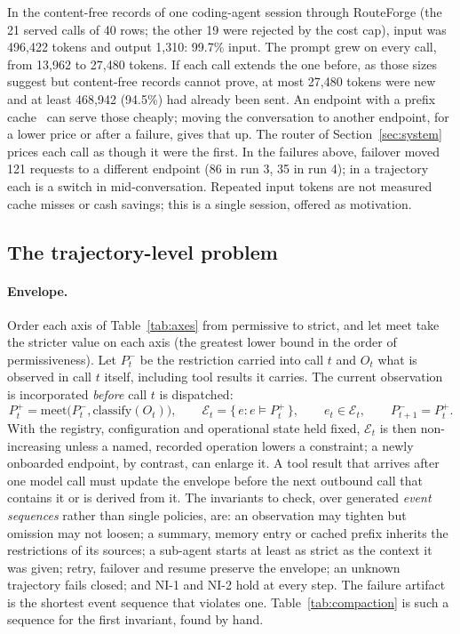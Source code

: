 \documentclass[11pt]{article}
\newcommand{\E}{\mathcal{E}}
\begin{document}
In the content-free records of one coding-agent session through RouteForge (the 21 served calls
of 40 rows; the other 19 were rejected by the cost cap), input was 496{,}422 tokens and output
1{,}310: 99.7\% input. The prompt grew on every call, from 13{,}962 to 27{,}480 tokens. If each
call extends the one before, as those sizes suggest but content-free records cannot prove, at
most 27{,}480 tokens were new and at least 468{,}942 (94.5\%) had already been sent. An endpoint
with a prefix cache~\cite{pagedattention,dynamo} can serve those cheaply; moving the conversation
to another endpoint, for a lower price or after a failure, gives that up. The router of
Section~\ref{sec:system} prices each call as though it were the first. In the failures above,
failover moved 121 requests to a different endpoint (86 in run 3, 35 in run 4); in a trajectory
each is a switch in mid-conversation. Repeated input tokens are not measured cache misses or cash
savings; this is a single session, offered as motivation.

\subsection{The trajectory-level problem}
\label{sec:trajproblem}

\paragraph{Envelope.} Order each axis of Table~\ref{tab:axes} from permissive to strict, and let
$\mathrm{meet}$ take the stricter value on each axis (the greatest lower bound in the order of
permissiveness). Let $P_t^{-}$ be the restriction carried into call $t$ and $O_t$ what is
observed in call $t$ itself, including tool results it carries. The current observation is
incorporated \emph{before} call $t$ is dispatched:
\begin{equation}
  P_t^{+} = \mathrm{meet}\bigl(P_t^{-}, \mathrm{classify}(O_t)\bigr), \qquad
  \E_t = \{\, e : e \models P_t^{+} \,\}, \qquad e_t \in \E_t, \qquad P_{t+1}^{-} = P_t^{+}.
  \label{eq:envelope}
\end{equation}
With the registry, configuration and operational state held fixed, $\E_t$ is then
non-increasing unless a named, recorded operation lowers a constraint; a newly onboarded
endpoint, by contrast, can enlarge it. A tool
result that arrives after one model call must update the envelope before the next outbound call
that contains it or is derived from it. The invariants to check, over generated \emph{event
sequences} rather than single policies, are: an observation may tighten but omission may not
loosen; a summary, memory entry or cached prefix inherits the restrictions of its sources; a
sub-agent starts at least as strict as the context it was given; retry, failover and resume
preserve the envelope; an unknown trajectory fails closed; and NI-1 and NI-2 hold at every step.
The failure artifact is the shortest event sequence that violates one.
Table~\ref{tab:compaction} is such a sequence for the first invariant, found by hand.
\end{document}
